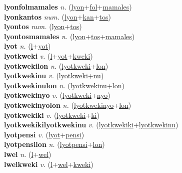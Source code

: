 \textbf{lyonfolmamales} \textit{n.} (\hyperref[lyon]{lyon}+\hyperref[fol]{fol}+\hyperref[mamales]{mamales})
 \label{lyonfolmamales} \\
\textbf{lyonkantos} \textit{num.} (\hyperref[lyon]{lyon}+\hyperref[kan]{kan}+\hyperref[tos]{tos})
 \label{lyonkantos} \\
\textbf{lyontos} \textit{num.} (\hyperref[lyon]{lyon}+\hyperref[tos]{tos})
 \label{lyontos} \\
\textbf{lyontosmamales} \textit{n.} (\hyperref[lyon]{lyon}+\hyperref[tos]{tos}+\hyperref[mamales]{mamales})
 \label{lyontosmamales} \\
\textbf{lyot} \textit{n.} (\hyperref[l]{l}+\hyperref[yot]{yot})
 \label{lyot} \\
\textbf{lyotkweki} \textit{v.} (\hyperref[l]{l}+\hyperref[yot]{yot}+\hyperref[kweki]{kweki})
 \label{lyotkweki} \\
\textbf{lyotkwekilon} \textit{n.} (\hyperref[lyotkweki]{lyotkweki}+\hyperref[lon]{lon})
 \label{lyotkwekilon} \\
\textbf{lyotkwekinu} \textit{v.} (\hyperref[lyotkweki]{lyotkweki}+\hyperref[nu]{nu})
 \label{lyotkwekinu} \\
\textbf{lyotkwekinulon} \textit{n.} (\hyperref[lyotkwekinu]{lyotkwekinu}+\hyperref[lon]{lon})
 \label{lyotkwekinulon} \\
\textbf{lyotkwekinyo} \textit{v.} (\hyperref[lyotkweki]{lyotkweki}+\hyperref[nyo]{nyo})
 \label{lyotkwekinyo} \\
\textbf{lyotkwekinyolon} \textit{n.} (\hyperref[lyotkwekinyo]{lyotkwekinyo}+\hyperref[lon]{lon})
 \label{lyotkwekinyolon} \\
\textbf{lyotkwekiki} \textit{v.} (\hyperref[lyotkweki]{lyotkweki}+\hyperref[ki]{ki})
 \label{lyotkwekiki} \\
\textbf{lyotkwekikilyotkwekinu} \textit{v.} (\hyperref[lyotkwekiki]{lyotkwekiki}+\hyperref[lyotkwekinu]{lyotkwekinu})
 \label{lyotkwekikilyotkwekinu} \\
\textbf{lyotpensi} \textit{v.} (\hyperref[lyot]{lyot}+\hyperref[pensi]{pensi})
 \label{lyotpensi} \\
\textbf{lyotpensilon} \textit{n.} (\hyperref[lyotpensi]{lyotpensi}+\hyperref[lon]{lon})
 \label{lyotpensilon} \\
\textbf{lwel} \textit{n.} (\hyperref[l]{l}+\hyperref[wel]{wel})
 \label{lwel} \\
\textbf{lwelkweki} \textit{v.} (\hyperref[l]{l}+\hyperref[wel]{wel}+\hyperref[kweki]{kweki})
 \label{lwelkweki} \\
